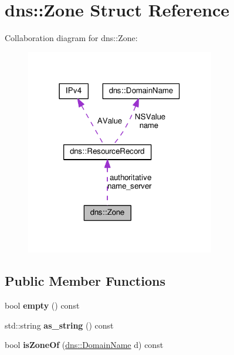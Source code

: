 \hypertarget{structdns_1_1Zone}{}\section{dns\+:\+:Zone Struct Reference}
\label{structdns_1_1Zone}


Collaboration diagram for dns\+:\+:Zone\+:
\nopagebreak
\begin{figure}[H]
\begin{center}
\leavevmode
\includegraphics[width=234pt]{structdns_1_1Zone__coll__graph}
\end{center}
\end{figure}
\subsection*{Public Member Functions}
\begin{DoxyCompactItemize}
\item 
bool {\bfseries empty} () const \hypertarget{structdns_1_1Zone_ad33a2d40f6301c559907d66f1c86d64e}{}\label{structdns_1_1Zone_ad33a2d40f6301c559907d66f1c86d64e}

\item 
std\+::string {\bfseries as\+\_\+string} () const \hypertarget{structdns_1_1Zone_a424d36efa5adc9e4f4b7e6073ade3763}{}\label{structdns_1_1Zone_a424d36efa5adc9e4f4b7e6073ade3763}

\item 
bool {\bfseries is\+Zone\+Of} (\hyperlink{structdns_1_1DomainName}{dns\+::\+Domain\+Name} d) const \hypertarget{structdns_1_1Zone_adbd4dcf69ed0f8ce57831b9231220463}{}\label{structdns_1_1Zone_adbd4dcf69ed0f8ce57831b9231220463}

\end{DoxyCompactItemize}

